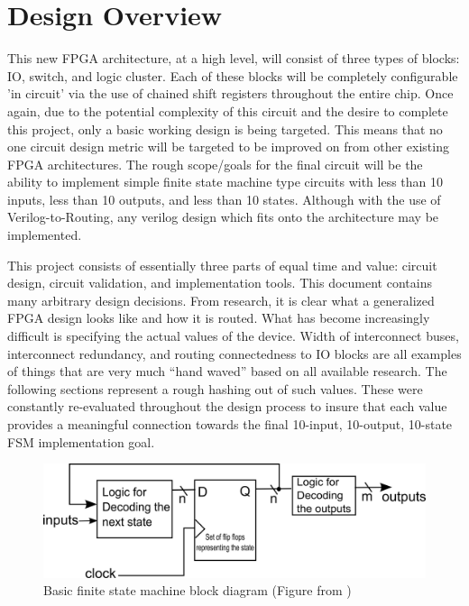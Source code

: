 \documentclass[12pt]{article}
\begin{document}
\newpage
\section{Design Overview}

This new FPGA architecture, at a high level, will consist of three types of blocks:
IO, switch, and logic cluster. Each of these blocks will be completely configurable 'in circuit'
via the use of chained shift registers throughout the entire chip. Once again, due 
to the potential complexity of this circuit and the desire to complete this project,
only a basic working design is being targeted. This means that no one circuit design
metric will be targeted to be improved on from other existing FPGA architectures.
The rough scope/goals for the final circuit will be the ability to implement simple
finite state machine type circuits with less than 10 inputs, less than 10 outputs, and
less than 10 states. Although with the use of Verilog-to-Routing, any verilog design
which fits onto the architecture may be implemented.

This project consists of essentially three parts of equal time and value: circuit 
design, circuit validation, and implementation tools. This document contains many 
arbitrary design decisions. From research, it is clear what a generalized FPGA design 
looks like and how it is routed. What has become increasingly difficult is specifying 
the actual values of the device. Width of interconnect buses, interconnect redundancy,
and routing connectedness to IO blocks are all examples of things that are very 
much “hand waved” based on all available research. The following 
sections represent a rough hashing out of such values. These were constantly 
re-evaluated throughout the design process to insure that each value provides a meaningful 
connection towards the final 10-input, 10-output, 10-state FSM implementation goal.

\begin{figure}[ht]
  \centering
  \includegraphics[width=.7\textwidth]{fsm}
  \caption{Basic finite state machine block diagram (Figure from \cite{fsm})}
  \label{fig:fsm}
\end{figure}
\end{document}
